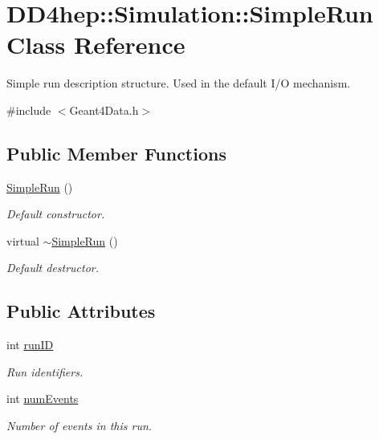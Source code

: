 \hypertarget{class_d_d4hep_1_1_simulation_1_1_simple_run}{
\section{DD4hep::Simulation::SimpleRun Class Reference}
\label{class_d_d4hep_1_1_simulation_1_1_simple_run}
}


Simple run description structure. Used in the default I/O mechanism.  


{\ttfamily \#include $<$Geant4Data.h$>$}\subsection*{Public Member Functions}
\begin{DoxyCompactItemize}
\item 
\hyperlink{class_d_d4hep_1_1_simulation_1_1_simple_run_a50e522275d994ec00d6e3a2d842713d5}{SimpleRun} ()
\begin{DoxyCompactList}\small\item\em Default constructor. \item\end{DoxyCompactList}\item 
virtual \hyperlink{class_d_d4hep_1_1_simulation_1_1_simple_run_a492b495267498387129a39d1c3da0850}{$\sim$SimpleRun} ()
\begin{DoxyCompactList}\small\item\em Default destructor. \item\end{DoxyCompactList}\end{DoxyCompactItemize}
\subsection*{Public Attributes}
\begin{DoxyCompactItemize}
\item 
int \hyperlink{class_d_d4hep_1_1_simulation_1_1_simple_run_a8d376fdac80fb3d671037537ca3aa858}{runID}
\begin{DoxyCompactList}\small\item\em Run identifiers. \item\end{DoxyCompactList}\item 
int \hyperlink{class_d_d4hep_1_1_simulation_1_1_simple_run_a7cbde1fd06c8893176d8d7b70386281d}{numEvents}
\begin{DoxyCompactList}\small\item\em Number of events in this run. \item\end{DoxyCompactList}\end{DoxyCompactItemize}


